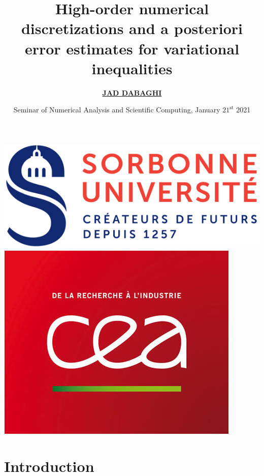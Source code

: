 \documentclass[aspectratio=169]{beamer}
\title{High-order numerical
discretizations and a posteriori error estimates for variational inequalities}
\author{\underline{\textbf{JAD DABAGHI}}}
\institute[]{Sorbonne Université (LJLL) \& CEA Paris Saclay }
\date{Seminar of Numerical Analysis and Scientific Computing, January $21^{\mathrm{st}}$ 2021}
\begin{document}



\begin{frame}
\maketitle
\includegraphics[scale=0.2]{logo_sorbonne}
\hfill 
\includegraphics[scale=0.13]{CEA}

\end{frame}



\section{Introduction}
\end{document}
